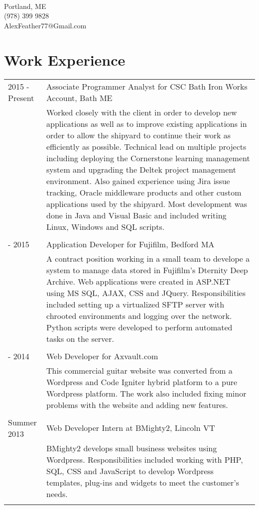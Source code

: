\documentclass[10pt]{article}
\begin{document}
\pagestyle{empty}
\selectfont

{\\
Portland, ME\\(978) 399 9828\\AlexFeather77@Gmail.com\\}

\section*{\selectfont Work Experience}
\begin{tabular}{p{2.1cm}|p{14.9cm}}
	2015 - Present & Associate Programmer Analyst for CSC Bath Iron Works Account, Bath ME\\&\footnotesize{Worked closely with the client in order to develop new applications as well as to improve existing applications in order to allow the shipyard to continue their work as efficiently as possible. Technical lead on multiple projects including deploying the Cornerstone learning management system and upgrading the Deltek project management environment. Also gained experience using Jira issue tracking, Oracle middleware products and other custom applications used by the shipyard. Most development was done in Java and Visual Basic and included writing Linux, Windows and SQL scripts.}\\\multicolumn{2}{c}{} \\
	\centering 2014 - 2015 & Application Developer for Fujifilm, Bedford MA\\&\footnotesize{A contract position working in a small team to develope a system to manage data stored in Fujifilm's Dternity Deep Archive. Web applications were created in ASP.NET using MS SQL, AJAX, CSS and JQuery. Responsibilities included setting up a virtualized SFTP server with chrooted environments and logging over the network. Python scripts were developed to perform automated tasks on the server.}\\\multicolumn{2}{c}{} \\
	\centering 2013 - 2014 & Web Developer for Axvault.com\\&\footnotesize{This commercial guitar website was converted from a Wordpress and Code Igniter hybrid platform to a pure Wordpress platform. The work also included fixing minor problems with the website and adding new features.}\\\multicolumn{2}{c}{} \\
	\centering Summer 2013 & Web Developer Intern at BMighty2, Lincoln VT\\&\footnotesize{BMighty2 develops small business websites using Wordpress. Responsibilities included working with PHP, SQL, CSS and JavaScript to develop Wordpress templates, plug-ins and widgets to meet the customer's needs.}\\\multicolumn{2}{c}{} \\
\end{tabular}
\end{document}
